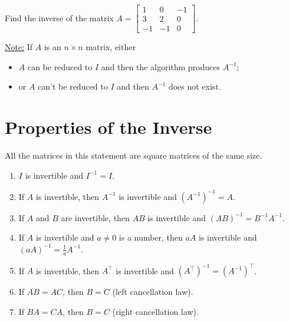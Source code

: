 \documentclass[20pt,a4paper]{extarticle}
\newcounter{example}
\newcounter{theorem}
\newcounter{algo}
\begin{document}
\begin{example}
Find the inverse of the matrix $A = \begin{bmatrix} 1 & 0 & -1 \\ 3 & 2 & 0 \\ -1 & -1 & 0 \end{bmatrix}$.
\end{example}

\begin{solution}

\end{solution}

\newpage 

\phantom{2} 

\vfill 

\underline{Note:} If $A$ is an $n \times n$ matrix, either 
	\begin{itemize}
		\item $A$ can be reduced to $I$ and then the algorithm produces $A^{-1}$;
		\item or $A$ can't be reduced to $I$ and then $A^{-1}$ does not exist.
	\end{itemize}

\newpage 

\section{Properties of the Inverse}

\begin{theorem}
All the matrices in this statement are square matrices of the same size.
\begin{enumerate}
	\item $I$ is invertible and $I^{-1} = I$.
	\item If $A$ is invertible, then $A^{-1}$ is invertible and $(A^{-1})^{-1} = A$.
	\item If $A$ and $B$ are invertible, then $AB$ is invertible and $(AB)^{-1} = B^{-1}A^{-1}$.
	\item If $A$ is invertible and $a \neq 0$ is a number, then $aA$ is invertible and $(aA)^{-1} = \frac{1}{a} A^{-1}$.
	\item If $A$ is invertible, then $A^{\top}$ is invertible and $(A^{\top})^{-1} = (A^{-1})^\top$.
	\item If $AB = AC$, then $B = C$ (left cancellation law).
	\item If $BA = CA$, then $B = C$ (right cancellation law).
\end{enumerate}
\end{theorem}
\end{document}
